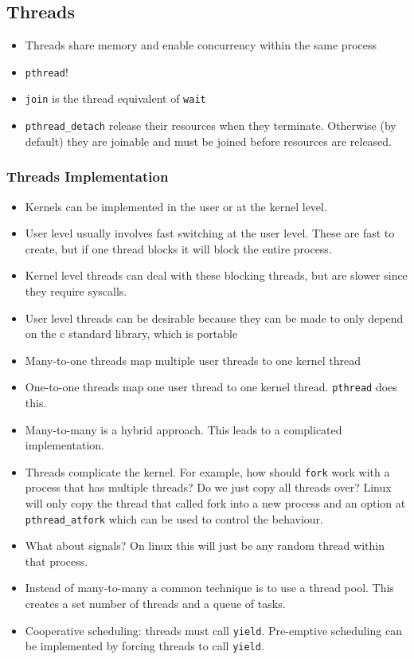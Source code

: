 \documentclass[../notes.tex]{subfiles}
\begin{document}
\subsection{Threads}


\begin{itemize}
    \item Threads share memory and enable concurrency within the same process
    \item \texttt{pthread}!
    \item \texttt{join} is the thread equivalent of \texttt{wait}
    \item \texttt{pthread\_detach} release their resources when they terminate. Otherwise (by default) they are joinable and must be joined before resources are released.

\end{itemize}

\subsubsection{Threads Implementation}

\begin{itemize}
    \item Kernels can be implemented in the user or at the kernel level.
    \item User level usually involves fast switching at the user level. These are fast to create, but if one thread blocks it will block the entire process.
    \item Kernel level threads can deal with these blocking threads, but are slower since they require syscalls.
    \item User level threads can be desirable because they can be made to only depend on the c standard library, which is portable
    \item Many-to-one threads map multiple user threads to one kernel thread
    \item One-to-one threads map one user thread to one kernel thread. \texttt{pthread} does this.
    \item Many-to-many is a hybrid approach. This leads to a complicated implementation.
    \item Threads complicate the kernel. For example, how should \texttt{fork} work with a process that has multiple threads? Do we just copy all threads over? Linux will only copy the thread that called fork into a new process and an option at \texttt{pthread\_atfork} which can be used to control the behaviour.
    \item What about signals? On linux this will just be any random thread within that process.
    \item Instead of many-to-many a common technique is to use a thread pool. This creates a set number of threads and a queue of tasks.
    \item Cooperative scheduling: threads must call \texttt{yield}. Pre-emptive scheduling can be implemented by forcing threads to call \texttt{yield}.
\end{itemize}
\end{document}
